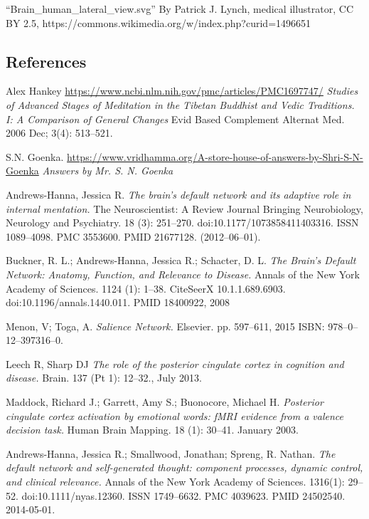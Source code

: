 \documentclass[a4paper, amsfonts, amssymb, amsmath, reprint, showkeys, nofootinbib, twoside]{revtex4-1}
\begin{document}
``Brain\_human\_lateral\_view.svg'' By Patrick J. Lynch, medical illustrator, CC BY
2.5, https://commons.wikimedia.org/w/index.php?curid=1496651

\begin{thebibliography}{99}

\section*{References}

  Alex Hankey
  \url{https://www.ncbi.nlm.nih.gov/pmc/articles/PMC1697747/}
  \textit{Studies of Advanced Stages of Meditation in the Tibetan
          Buddhist and Vedic Traditions. I: A Comparison of General Changes}
  Evid Based Complement Alternat Med. 2006 Dec; 3(4): 513–521.

  S.N. Goenka.
  \url{https://www.vridhamma.org/A-store-house-of-answers-by-Shri-S-N-Goenka}
  \textit{Answers by Mr. S. N. Goenka}

  Andrews-Hanna, Jessica R.
  \textit{The brain’s default network and its adaptive role in internal mentation.}
  The Neuroscientist: A Review Journal Bringing Neurobiology, Neurology and
  Psychiatry. 18 (3): 251–270. doi:10.1177/1073858411403316. ISSN 1089–4098. PMC
  3553600. PMID 21677128. (2012–06–01).

  Buckner, R. L.; Andrews-Hanna, Jessica R.; Schacter, D. L.
  \textit{The Brain's Default Network: Anatomy, Function, and Relevance to Disease.}
  Annals of the New York Academy of Sciences. 1124 (1): 1–38. CiteSeerX
  10.1.1.689.6903. doi:10.1196/annals.1440.011. PMID 18400922, 2008

  Menon, V; Toga, A.
  \textit{Salience Network.}
  Elsevier. pp. 597–611, 2015
  ISBN: 978–0–12–397316–0.

  Leech R, Sharp DJ
  \textit{The role of the posterior cingulate cortex in cognition and disease.}
  Brain. 137 (Pt 1): 12–32., July 2013.

  Maddock, Richard J.; Garrett, Amy S.; Buonocore, Michael H.
  \textit{Posterior cingulate cortex activation by emotional words: fMRI evidence from a
    valence decision task.}
  Human Brain Mapping. 18 (1): 30–41. January 2003.

  Andrews-Hanna, Jessica R.; Smallwood, Jonathan; Spreng, R. Nathan.
  \textit{The default network and self-generated thought: component processes,
    dynamic control, and clinical relevance.}
  Annals of the New York Academy of Sciences. 1316(1):
  29–52. doi:10.1111/nyas.12360. ISSN 1749–6632. PMC 4039623. PMID 24502540. 2014-05-01.


\end{thebibliography}
\end{document}
